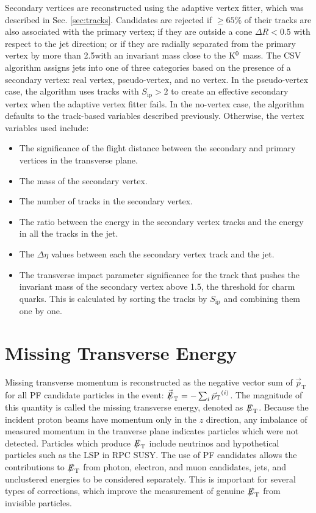 \documentclass[12pt]{thesis}  %
\def\eslash{\ensuremath{{\hbox{$E$\kern-0.6em\lower-.05ex\hbox{/}\kern0.10em}}}}
\def\vecmet{\mbox{$\vec{\eslash}_\text{T}$}\xspace} %
\def\vecpt{\mbox{$\vec{p}_\text{T}$}\xspace} %
\def\met{\mbox{$\eslash_\text{T}$}\xspace} %
\begin{document}
Secondary vertices are reconstructed using the adaptive vertex fitter, which was described in Sec. \ref{sec:tracks}. Candidates are rejected if ${\geq}65\%$ of their tracks are also associated with the primary vertex; if they are outside a cone $\Delta R < 0.5$ with respect to the jet direction; or if they are radially separated from the primary vertex by more than 2.5\cm with an invariant mass close to the $\mathrm{K}^{0}$ mass. The CSV algorithm assigns jets into one of three categories based on the presence of a secondary vertex: real vertex, pseudo-vertex, and no vertex. In the pseudo-vertex case, the algorithm uses tracks with $S_{\text{ip}} > 2$ to create an effective secondary vertex when the adaptive vertex fitter fails. In the no-vertex case, the algorithm defaults to the track-based variables described previously. Otherwise, the vertex variables used include:
\begin{itemize}
\item The significance of the flight distance between the secondary and primary vertices in the transverse plane.
\item The mass of the secondary vertex.
\item The number of tracks in the secondary vertex.
\item The ratio between the energy in the secondary vertex tracks and the energy in all the tracks in the jet.
\item The $\Delta\eta$ values between each the secondary vertex track and the jet.
\item The transverse impact parameter significance for the track that pushes the invariant mass of the secondary vertex above 1.5\GeVcc, the threshold for charm quarks. This is calculated by sorting the tracks by $S_{\text{ip}}$ and combining them one by one.
\end{itemize}

\section{Missing Transverse Energy
\label{sec:met}}

Missing transverse momentum is reconstructed as the negative vector sum of \vecpt for all PF candidate particles in the event: $\vecmet = - \sum_{i} \vecpt^{(i)}$. The magnitude of this quantity is called the missing transverse energy, denoted as \met. Because the incident proton beams have momentum only in the $z$ direction, any imbalance of measured momentum in the tranverse plane indicates particles which were not detected. Particles which produce \met include neutrinos and hypothetical particles such as the LSP in RPC SUSY. The use of PF candidates allows the contributions to \met from photon, electron, and muon candidates, jets, and unclustered energies to be considered separately. This is important for several types of corrections, which improve the measurement of genuine \met from invisible particles.
\end{document}
